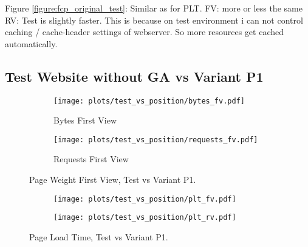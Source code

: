 Figure \ref{figure:fcp_original_test}:
Similar as for PLT.
FV: more or less the same
RV: Test is slightly faster. This is because on test environment i can not control caching / cache-header settings of webserver. So more resources get cached automatically.









\subsection{Test Website without GA vs Variant P1}



\begin{figure}
	\centering
	\begin{subfigure}{.5\textwidth}
		\centering
		\texttt{[image: plots/test\_vs\_position/bytes\_fv.pdf]}
		\caption{Bytes First View}
		\label{fig:sub1}
	\end{subfigure}%
	\begin{subfigure}{.5\textwidth}
		\centering
		\texttt{[image: plots/test\_vs\_position/requests\_fv.pdf]}
		\caption{Requests First View}
		\label{fig:sub2}
	\end{subfigure}
	\caption{Page Weight First View, Test vs Variant P1.}
	\label{figure:plt_original_test}
\end{figure}





\begin{figure}
	\centering
	\begin{subfigure}{.5\textwidth}
		\centering
		\texttt{[image: plots/test\_vs\_position/plt\_fv.pdf]}
		\label{fig:sub1}
	\end{subfigure}%
	\begin{subfigure}{.5\textwidth}
		\centering
		\texttt{[image: plots/test\_vs\_position/plt\_rv.pdf]}
		\label{fig:sub2}
	\end{subfigure}
	\caption{Page Load Time, Test vs Variant P1.}
	\label{figure:plt_original_test}
\end{figure}

